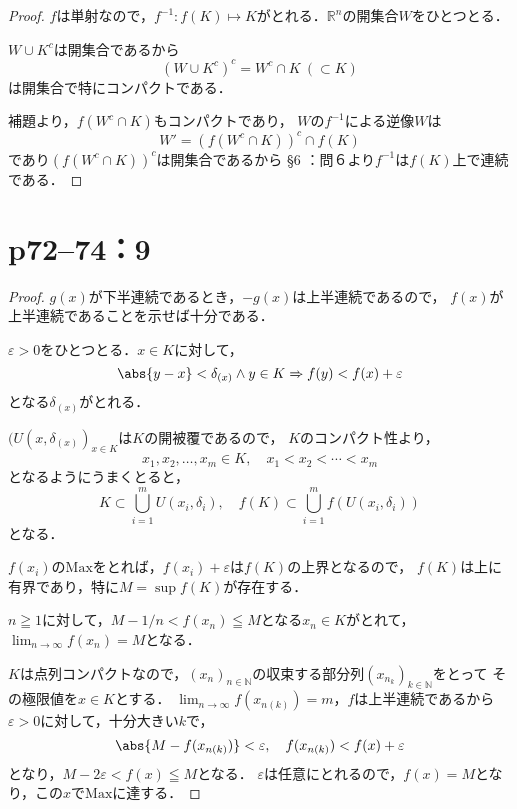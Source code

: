 \begin{tleftbar}
    \begin{proof}
        $f$は単射なので，$f^{-1} \colon f(K) \mapsto K$がとれる．$\mathbb{R}^n$の開集合$W$をひとつとる．

        $W \cup K^c$は開集合であるから
        \[
            (W \cup K^c)^c = W^c \cap K~(\subset K)
        \]
        は開集合で特にコンパクトである．

        補題より，$f(W^c \cap K)$もコンパクトであり，
        $W$の$f^{-1}$による逆像$W$は
        \[
            W' = (f(W^c \cap K))^c \cap f(K)
        \]
        であり$(f(W^c \cap K))^c$は開集合であるから
        \S 6 ：問６より$f^{-1}$は$f(K)$上で連続である．
    \end{proof}
\end{tleftbar}

\newpage

\section*{p72--74：9}

\begin{tleftbar}
    \begin{proof}
        $g(x)$が下半連続であるとき，$-g(x)$は上半連続であるので，
        $f(x)$が上半連続であることを示せば十分である．

        $\varepsilon >0$をひとつとる．$ x\in K$に対して，
        \[
            \abs{y-x} < \delta_{(x)} \land y \in K \Rightarrow f(y) < f(x) + \varepsilon
        \]
        となる$\delta_{(x)}$がとれる．

        $(U(x,\delta_{(x)})_{x\in K}$は$K$の開被覆であるので，
        $K$のコンパクト性より，
        \[
            x_1 , x_2, \ldots , x_m \in K , \quad x_1 < x_2 < \cdots < x_m
        \]
        となるようにうまくとると，
        \[
            K \subset \bigcup_{i=1}^m U(x_i,\delta_i) ,\quad f(K) \subset \bigcup_{i=1}^m f(U(x_i,\delta_i))
        \]
        となる．

        $f(x_i)$の$\mathrm{Max}$をとれば，$f(x_i)+\varepsilon$は$f(K)$の上界となるので，
        $f(K)$は上に有界であり，特に$M = \sup f(K)$が存在する．

        $n \geqq 1$に対して，$ M - 1/n < f(x_n) \leqq M$となる$x_n \in K$がとれて，
        $\lim_{n \to \infty} f(x_n) = M$となる．

        $K$は点列コンパクトなので，$(x_n)_{n \in \mathbb{N}}$の収束する部分列$(x_{n_k})_{k \in \mathbb{N}}$をとって
        その極限値を$ x\in K$とする．
        $\lim_{n \to \infty} f(x_{n(k)})=m$，$f$は上半連続であるから
        $\varepsilon >0$に対して，十分大きい$k$で，
        \[
            \abs{M-f(x_{n(k)})} < \varepsilon,\quad f(x_{n(k)})<f(x)+\varepsilon
        \]
        となり，$M-2 \varepsilon < f(x) \leqq M $となる．
        $\varepsilon$は任意にとれるので，$f(x) = M$となり，この$x$で$\mathrm{Max}$に達する．
    \end{proof}
\end{tleftbar}


